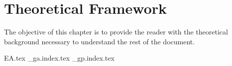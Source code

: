 \chapter{Theoretical Framework}
\label{chap:bg}
  The objective of this chapter is to provide the reader with the theoretical 
  background necessary to understand the rest of the document.
  
  {EA.tex}
  {_ga.index.tex}
  {_gp.index.tex}
  